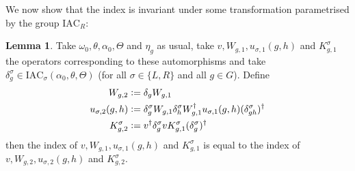 \documentclass[12pt,a4paper,twoside]{article}
\newcommand{\IAC}{\textrm{IAC}}
\newcommand{\defeq}{\vcentcolon=}
\theoremstyle{definition}
\newtheorem{lemma}[theorem]{Lemma}
\numberwithin{equation}{section}
\begin{document}
We now show that the index is invariant under some transformation parametrised by the group $\IAC_R$:
\begin{lemma}\label{lem:TransformationUnderDelta}
	Take $\omega_0,\theta,\alpha_0,\Theta$ and $\eta_g$ as usual, take $v,W_{g,1},u_{\sigma,1}(g,h)$ and $K_{g,1}^\sigma$ the operators corresponding to these automorphisms and take $\delta^\sigma_g\in\IAC_\sigma(\alpha_0,\theta,\Theta)$ (for all $\sigma\in\{L,R\}$ and all $g\in G$). Define
	\begin{align}
		W_{g,2}&\defeq\delta_g W_{g,1}\\
		u_{\sigma,2}(g,h)&\defeq \delta_g^\sigma W_{g,1}\delta_h^\sigma W_{g,1}^\dagger u_{\sigma,1}(g,h)(\delta_{gh}^\sigma)^\dagger\\
		K^\sigma_{g,2}&\defeq v^\dagger \delta_g^\sigma v K_{g,1}^\sigma (\delta_g^\sigma)^\dagger
	\end{align}
	then the index of $v,W_{g,1},u_{\sigma,1}(g,h)$ and $K_{g,1}^\sigma$ is equal to the index of $v,W_{g,2},u_{\sigma,2}(g,h)$ and $K_{g,2}^\sigma$.
\end{lemma}
\end{document}
